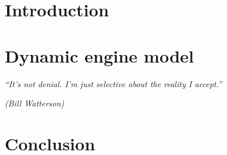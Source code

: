 \textual

\chapter*[Introduction]{Introduction}

\chapter{Dynamic engine model}
\epigraph{\em ``It's not denial. I'm just selective about the reality I
accept.''}{\em(Bill Watterson)}


\chapter*{Conclusion}
